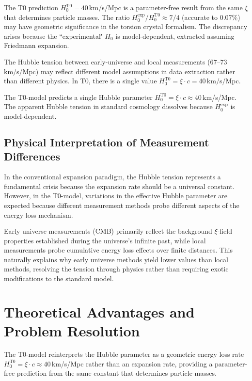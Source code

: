 \documentclass[12pt,a4paper]{report}
\begin{document}
	The T0 prediction $H_0^{\text{T0}} = 40\,$km/s/Mpc is a parameter-free result from the same $\xi$ that determines particle masses. The ratio $H_0^{\text{exp}}/H_0^{\text{T0}} \approx 7/4$ (accurate to $0.07\%$) may have geometric significance in the torsion crystal formalism. The discrepancy arises because the ``experimental\'\' $H_0$ is model-dependent, extracted assuming Friedmann expansion.
	
	The Hubble tension between early-universe and local measurements ($67$--$73\,$km/s/Mpc) may reflect different model assumptions in data extraction rather than different physics. In T0, there is a single value $H_0^{\text{T0}} = \xi \cdot c = 40\,$km/s/Mpc.
	
	\begin{experimental}
		The T0-model predicts a single Hubble parameter $H_0^{\text{T0}} = \xi \cdot c \approx 40\,$km/s/Mpc. The apparent Hubble tension in standard cosmology dissolves because $H_0^{\text{exp}}$ is model-dependent.
	\end{experimental}
	
	\subsection{Physical Interpretation of Measurement Differences}
	
	In the conventional expansion paradigm, the Hubble tension represents a fundamental crisis because the expansion rate should be a universal constant. However, in the T0-model, variations in the effective Hubble parameter are expected because different measurement methods probe different aspects of the energy loss mechanism.
	
	Early universe measurements (CMB) primarily reflect the background $\xi$-field properties established during the universe's infinite past, while local measurements probe cumulative energy loss effects over finite distances. This naturally explains why early universe methods yield lower values than local methods, resolving the tension through physics rather than requiring exotic modifications to the standard model.
	
	\section{Theoretical Advantages and Problem Resolution}
	
	The T0-model reinterprets the Hubble parameter as a geometric energy loss rate $H_0^{\text{T0}} = \xi \cdot c \approx 40\,$km/s/Mpc rather than an expansion rate, providing a parameter-free prediction from the same constant that determines particle masses.
	
\end{document}
